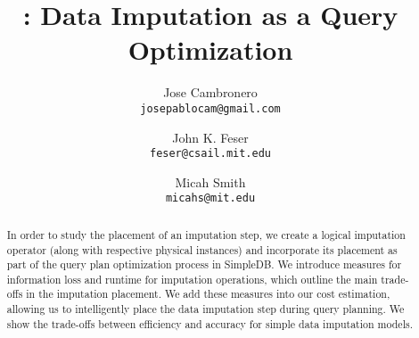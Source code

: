 \documentclass{vldb}
\title{\ProjectName{}: Data Imputation as a Query Optimization}
\author{
  Jose Cambronero \\
  \texttt{josepablocam@gmail.com}
  \and
  John K. Feser \\
  \texttt{feser@csail.mit.edu}
  \and
  Micah Smith \\
  \texttt{micahs@mit.edu}}
\begin{document}
\maketitle

\begin{abstract}
In order to study the placement of an imputation step, we create a logical imputation operator (along with respective physical instances) and incorporate its placement as part of the query plan optimization process in SimpleDB.  We introduce measures for information loss and runtime for imputation operations, which outline the main trade-offs in the imputation placement. We add these measures into our cost estimation, allowing us to intelligently place the data imputation step during query planning. We show the trade-offs between efficiency and accuracy for simple data imputation models. \end{abstract}








\balance
\printbibliography
\end{document}
